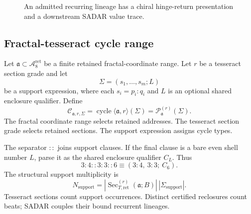 \begin{figure}[H]
\centering
{}
\caption{An admitted recurring lineage has a chiral hinge-return presentation and a downstream SADAR value trace.}
\label{fig:cycle-wave-identity}
\end{figure}

\subsection{Fractal-tesseract cycle range}
\label{subsec:fractal-tesseract-cycle-range}
Let \(\mathfrak a\subset\mathcal A^{\mathrm{ret}}_8\) be a finite retained fractal-coordinate range. Let \(r\) be a tesseract section grade and let
\[
\Sigma=(s_1,\ldots,s_m;L)
\]
be a support expression, where each \(s_i=p_i{:}q_i\) and \(L\) is an optional shared enclosure qualifier. Define
\begin{equation}
\mathcal C_{\mathfrak a,r,\Sigma}
=
\operatorname{cycle}\langle\mathfrak a,r\rangle(\Sigma)
=
\mathcal P^{(r)}_{\mathfrak a}(\Sigma).
\label{eq:fractal-tesseract-cycle-range}
\end{equation}
The fractal coordinate range selects retained addresses. The tesseract section grade selects retained sections. The support expression assigns cycle types.

The separator \(::\) joins support clauses. If the final clause is a bare even shell number \(L\), parse it as the shared enclosure qualifier \(C_L\). Thus
\begin{equation}
3{:}4::3{:}3::6
\equiv
(3{:}4,\ 3{:}3;\ C_6).
\label{eq:double-colon-parse-example}
\end{equation}
The structural support multiplicity is
\begin{equation}
N_{\mathrm{support}}
=
|\operatorname{Sec}^{(r)}_{T,\mathrm{ret}}(\mathfrak a;B)|\,|\Sigma_{\mathrm{support}}|.
\label{eq:beat-count}
\end{equation}
Tesseract sections count support occurrences. Distinct certified reclosures count beats; SADAR couples their bound recurrent lineages.

